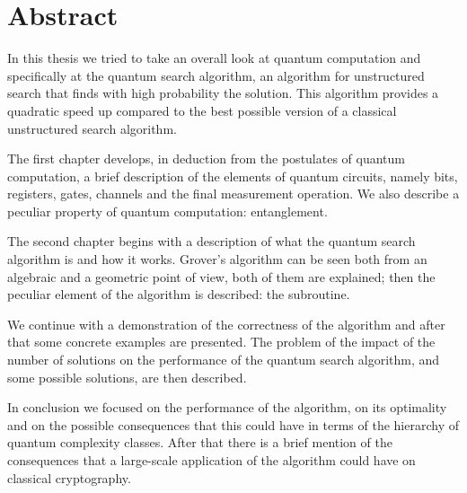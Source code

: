\chapter{Abstract}
In this thesis we tried to take an overall look at quantum computation and specifically at the quantum search algorithm, an algorithm for unstructured search that finds with high probability the solution.
This algorithm provides a quadratic speed up compared to the best possible version of a classical unstructured search algorithm.

\bigskip

The first chapter develops, in deduction from the postulates of quantum computation, a brief description of the elements of quantum circuits, namely bits, registers, gates, channels and the final measurement operation.
We also describe a peculiar property of quantum computation: entanglement. 

\bigskip

The second chapter begins with a description of what the quantum search algorithm is and how it works. Grover's algorithm can be seen both from an algebraic and a geometric point of view, both of them are explained; then the peculiar element of the algorithm is described: the subroutine.

We continue with a demonstration of the correctness of the algorithm and after that some concrete examples are presented.
The problem of the impact of the number of solutions on the performance of the quantum search algorithm, and some possible solutions, are then described.

In conclusion we focused on the performance of the algorithm, on its optimality and on the possible consequences that this could have in terms of the hierarchy of quantum complexity classes.
After that there is a brief mention of the consequences that a large-scale application of the algorithm could have on classical cryptography.